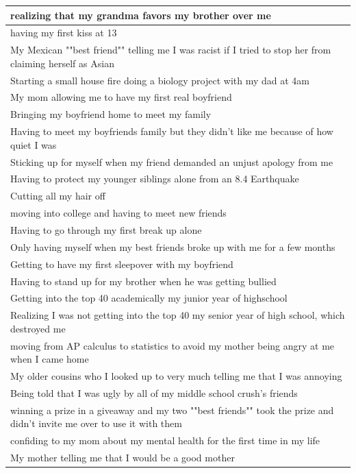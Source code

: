 \documentclass[
  .7em,
  letterpaper,
  DIV=11,
  numbers=noendperiod]{scrartcl}
\begin{document}
\begin{table}
\begin{tabular}{l}
\hline
realizing that my grandma favors my brother over me\\
\hline
having my first kiss at 13\\
\hline
My Mexican ""best friend"" telling me I was racist if I tried to stop her from claiming herself as Asian\\
\hline
Starting a small house fire doing a biology project with my dad at 4am\\
\hline
My mom allowing me to have my first real boyfriend\\
\hline
Bringing my boyfriend home to meet my family\\
\hline
Having to meet my boyfriends family but they didn't like me because of how quiet I was\\
\hline
Sticking up for myself when my friend demanded an unjust apology from me\\
\hline
Having to protect my younger siblings alone from an 8.4 Earthquake\\
\hline
Cutting all my hair off\\
\hline
moving into college and having to meet new friends\\
\hline
Having to go through my first break up alone\\
\hline
Only having myself when my best friends broke up with me for a few months\\
\hline
Getting to have my first sleepover with my boyfriend\\
\hline
Having to stand up for my brother when he was getting bullied\\
\hline
Getting into the top 40 academically my junior year of highschool\\
\hline
Realizing I was not getting into the top 40 my senior year of high school, which destroyed me\\
\hline
moving from AP calculus to statistics to avoid my mother being angry at me when I came home\\
\hline
My older cousins who I looked up to very much telling me that I was annoying\\
\hline
Being told that I was ugly by all of my middle school crush's friends\\
\hline
winning a prize in a giveaway and my two ""best friends"" took the prize and didn't invite me over to use it with them\\
\hline
confiding to my mom about my mental health for the first time in my life\\
\hline
My mother telling me that I would be a good mother\\

\end{tabular}
\end{table}
\end{document}

